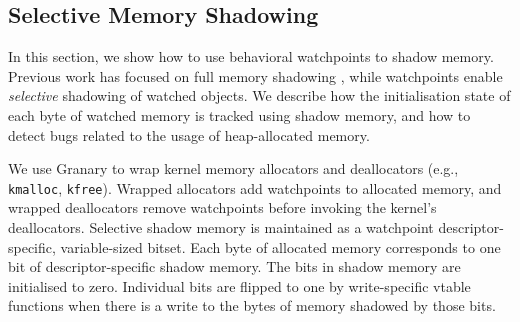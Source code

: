 \documentclass[letterpaper,twocolumn,10pt]{article}
\begin{document}
\subsection{Selective Memory Shadowing\label{sec:uninitialised_memory}}

In this section, we show how to use behavioral watchpoints to shadow memory. Previous work has focused on full memory shadowing \cite{Memcheck}, while watchpoints enable \emph{selective} shadowing of watched objects. We describe how the initialisation state of each byte of watched memory is tracked using shadow memory, and how to detect bugs related to the usage of heap-allocated memory.

We use Granary to wrap kernel memory allocators and deallocators (e.g., \texttt{kmalloc}, \texttt{kfree}). Wrapped allocators add watchpoints to allocated memory, and wrapped deallocators remove watchpoints before invoking the kernel's deallocators. Selective shadow memory is maintained as a watchpoint descriptor-specific, variable-sized bitset. %
Each byte of allocated memory corresponds to one bit of descriptor-specific shadow memory. The bits in shadow memory are initialised to zero. Individual bits are flipped to one by write-specific vtable functions when there is a write to the bytes of memory shadowed by those bits. 

 





\end{document}
